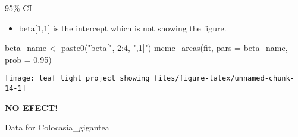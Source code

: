 \documentclass[
]{article}
\newenvironment{Shaded}{\begin{snugshade}}{\end{snugshade}}
\newcommand{\AttributeTok}[1]{\textcolor[rgb]{0.77,0.63,0.00}{#1}}
\newcommand{\DecValTok}[1]{\textcolor[rgb]{0.00,0.00,0.81}{#1}}
\newcommand{\ErrorTok}[1]{\textcolor[rgb]{0.64,0.00,0.00}{\textbf{#1}}}
\newcommand{\FloatTok}[1]{\textcolor[rgb]{0.00,0.00,0.81}{#1}}
\newcommand{\FunctionTok}[1]{\textcolor[rgb]{0.00,0.00,0.00}{#1}}
\newcommand{\NormalTok}[1]{#1}
\newcommand{\OtherTok}[1]{\textcolor[rgb]{0.56,0.35,0.01}{#1}}
\newcommand{\SpecialCharTok}[1]{\textcolor[rgb]{0.00,0.00,0.00}{#1}}
\newcommand{\StringTok}[1]{\textcolor[rgb]{0.31,0.60,0.02}{#1}}
\providecommand{\tightlist}{%
  \setlength{\itemsep}{0pt}\setlength{\parskip}{0pt}}
\begin{document}
95\% CI

\begin{itemize}
\tightlist
\item
  beta{[}1,1{]} is the intercept which is not showing the figure.
\end{itemize}

\begin{Shaded}
\begin{Highlighting}[]
\NormalTok{beta\_name }\OtherTok{\textless{}{-}} \FunctionTok{paste0}\NormalTok{(}\StringTok{"beta["}\NormalTok{, }\DecValTok{2}\SpecialCharTok{:}\DecValTok{4}\NormalTok{, }\StringTok{",1]"}\NormalTok{)}
\FunctionTok{mcmc\_areas}\NormalTok{(fit,}
           \AttributeTok{pars =}\NormalTok{ beta\_name,}
           \AttributeTok{prob =} \FloatTok{0.95}\NormalTok{)}
\end{Highlighting}
\end{Shaded}

\begin{center}\texttt{[image: leaf\_light\_project\_showing\_files/figure-latex/unnamed-chunk-14-1]} \end{center}

\textbf{NO EFECT!}

Data for Colocasia\_gigantea

\begin{Shaded}
\end{Shaded}
\end{document}
